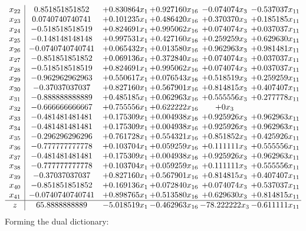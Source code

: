 \documentclass[11pt]{article}
\begin{document}
\[\begin{array}{c| c c@{\hskip 2pt} c@{\hskip 2pt} c@{\hskip 2pt} c@{\hskip 2pt} }
 x_{22}   &  0.851851851852 & + 0.830864 x_{1} & + 0.927160 x_{16} & -0.074074 x_{3} & -0.537037 x_{11}\\
 x_{23}   &  0.0740740740741 & + 0.101235 x_{1} & + 0.486420 x_{16} & + 0.370370 x_{3} & + 0.185185 x_{11}\\
 x_{24}   &  -0.518518518519 & + 0.824691 x_{1} & + 0.995062 x_{16} & + 0.074074 x_{3} & + 0.037037 x_{11}\\
 x_{25}   &  -0.148148148148 & + 0.997531 x_{1} & + 0.427160 x_{16} & + 0.259259 x_{3} & + 0.629630 x_{11}\\
 x_{26}   &  -0.0740740740741 & + 0.065432 x_{1} & + 0.013580 x_{16} & + 0.962963 x_{3} & + 0.981481 x_{11}\\
 x_{27}   &  -0.851851851852 & + 0.069136 x_{1} & + 0.372840 x_{16} & + 0.074074 x_{3} & + 0.037037 x_{11}\\
 x_{28}   &  -0.518518518519 & + 0.824691 x_{1} & + 0.995062 x_{16} & + 0.074074 x_{3} & + 0.037037 x_{11}\\
 x_{29}   &  -0.962962962963 & + 0.550617 x_{1} & + 0.076543 x_{16} & + 0.518519 x_{3} & + 0.259259 x_{11}\\
 x_{30}   &  -0.37037037037 & + 0.827160 x_{1} & + 0.567901 x_{16} & + 0.814815 x_{3} & + 0.407407 x_{11}\\
 x_{31}   &  -0.888888888889 & + 0.485185 x_{1} & + 0.062963 x_{16} & + 0.555556 x_{3} & + 0.277778 x_{11}\\
 x_{32}   &  -0.666666666667 & + 0.755556 x_{1} & + 0.622222 x_{16} & + 0 x_{3} &   \\
 x_{33}   &  -0.481481481481 & + 0.175309 x_{1} & + 0.004938 x_{16} & + 0.925926 x_{3} & + 0.962963 x_{11}\\
 x_{34}   &  -0.481481481481 & + 0.175309 x_{1} & + 0.004938 x_{16} & + 0.925926 x_{3} & + 0.962963 x_{11}\\
 x_{35}   &  -0.296296296296 & + 0.761728 x_{1} & + 0.554321 x_{16} & + 0.851852 x_{3} & + 0.425926 x_{11}\\
 x_{36}   &  -0.777777777778 & + 0.103704 x_{1} & + 0.059259 x_{16} & + 0.111111 x_{3} & + 0.555556 x_{11}\\
 x_{37}   &  -0.481481481481 & + 0.175309 x_{1} & + 0.004938 x_{16} & + 0.925926 x_{3} & + 0.962963 x_{11}\\
 x_{38}   &  -0.777777777778 & + 0.103704 x_{1} & + 0.059259 x_{16} & + 0.111111 x_{3} & + 0.555556 x_{11}\\
 x_{39}   &  -0.37037037037 & + 0.827160 x_{1} & + 0.567901 x_{16} & + 0.814815 x_{3} & + 0.407407 x_{11}\\
 x_{40}   &  -0.851851851852 & + 0.169136 x_{1} & + 0.072840 x_{16} & + 0.074074 x_{3} & + 0.537037 x_{11}\\
 x_{41}   &  -0.0740740740741 & + 0.898765 x_{1} & + 0.513580 x_{16} & + 0.629630 x_{3} & + 0.814815 x_{11}\\
\hline
z    &  65.8888888889 & -5.018519 x_{1} & -0.462963 x_{16} & -78.222222 x_{3} & -0.611111 x_{11}\\
\end{array}\]
Forming the dual dictionary:
\end{document}
